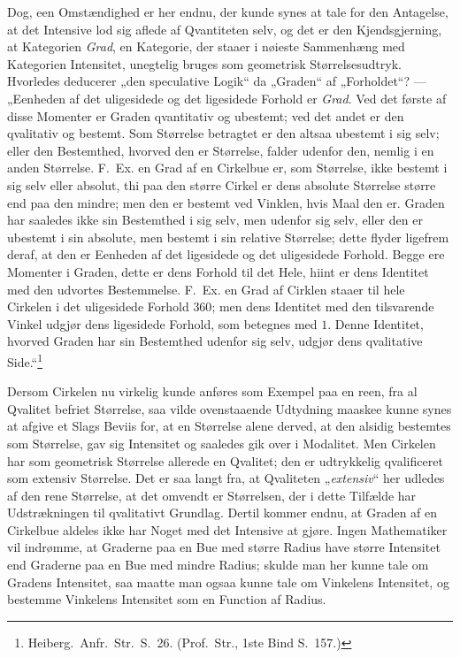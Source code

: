 \documentclass[12pt]{book}
\newcommand{\opage}[1]{\marginnote{\footnotesize\textit{[#1]}}}
\begin{document}
Dog, een Omstændighed er her endnu, der kunde synes at tale for den Antagelse, at det Intensive lod sig
aflede af
\opage{309} Qvantiteten selv, og det er den Kjendsgjerning, at Kategorien \emph{Grad}, en Kategorie, der staaer i
nøieste Sammenhæng med Kategorien Intensitet, unegtelig bruges som geometrisk Størrelsesudtryk. Hvorledes
deducerer „den speculative Logik“ da „Graden“ af „Forholdet“? --- „Eenheden af det uligesidede og det
ligesidede Forhold er \emph{Grad}. Ved det første af disse Momenter er Graden qvantitativ og ubestemt;
ved det andet er den qvalitativ og bestemt. Som Størrelse betragtet er den altsaa ubestemt i sig selv;
eller den Bestemthed, hvorved den er Størrelse, falder udenfor den, nemlig i en anden Størrelse. F.\ Ex.
en Grad af en Cirkelbue er, som Størrelse, ikke bestemt i sig selv eller absolut, thi paa den større
Cirkel er dens absolute Størrelse større end paa den mindre; men den er bestemt ved Vinklen, hvis Maal
den er. Graden har saaledes ikke sin Bestemthed i sig selv, men udenfor sig selv, eller den er ubestemt i
sin absolute, men bestemt i sin relative Størrelse; dette flyder ligefrem deraf, at den er Eenheden af
det ligesidede og det uligesidede Forhold. Begge ere Momenter i Graden, dette er dens Forhold til det
Hele, hiint er dens Identitet med den udvortes Bestemmelse. F.\ Ex. en Grad af Cirklen staaer til hele
Cirkelen i det uligesidede Forhold $360$; men dens Identitet med den tilsvarende Vinkel udgjør dens
ligesidede Forhold, som betegnes med $1$. Denne Identitet, hvorved Graden har sin Bestemthed udenfor sig
selv, udgjør dens qvalitative Side.“\footnote{Heiberg.\ Anfr.\ Str.\ S.~26. (Prof.\ Str., 1ste Bind
S.~157.)}

Dersom Cirkelen nu virkelig kunde anføres som Exempel paa en reen, fra al Qvalitet befriet Størrelse, saa
vilde ovenstaaende Udtydning maaskee kunne synes at afgive et Slags Beviis for, at en Størrelse alene
derved, at den alsidig bestemtes som Størrelse, gav sig Intensitet og saaledes gik over i Modalitet. Men
Cirkelen har som geometrisk Størrelse allerede en Qvalitet; den er udtrykkelig qvalificeret som extensiv
Størrelse.
\opage{310} Det er saa langt fra, at Qvaliteten „\emph{extensiv}“ her udledes af den rene Størrelse, at det omvendt
er Størrelsen, der i dette Tilfælde har Udstrækningen til qvalitativt Grundlag. Dertil kommer endnu, at
Graden af en Cirkelbue aldeles ikke har Noget med det Intensive at gjøre. Ingen Mathematiker vil
indrømme, at Graderne paa en Bue med større Radius have større Intensitet end Graderne paa en Bue med
mindre Radius; skulde man her kunne tale om Gradens Intensitet, saa maatte man ogsaa kunne tale om
Vinkelens Intensitet, og bestemme Vinkelens Intensitet som en Function af Radius.
\end{document}
